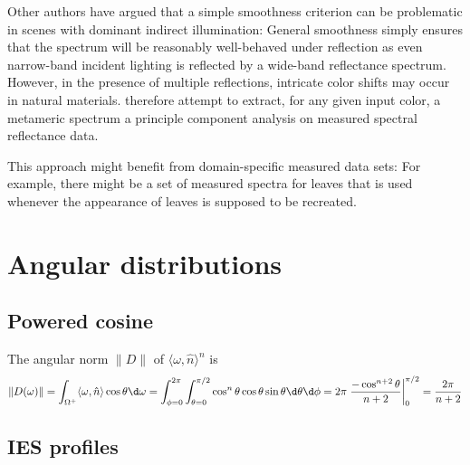Other authors have argued that a simple smoothness criterion can be problematic
in scenes with dominant indirect illumination: 
General smoothness simply ensures that the spectrum
will be reasonably well-behaved under reflection as even narrow-band incident lighting is
reflected by a wide-band reflectance spectrum. However, in the presence of multiple
reflections, intricate color shifts may occur in natural materials.
\citet{otsu2017} therefore attempt to extract, for any given input color, a metameric spectrum 
a principle component analysis on measured spectral reflectance data.

This approach might benefit from domain-specific measured data sets: For example, there might
be a set of measured spectra for leaves that is used whenever the appearance of leaves
is supposed to be recreated.



\section{Angular distributions}\label{sec:angular_norm}

\subsection{Powered cosine}

The angular norm $\|D\|$ of $\langle \omega, \hat n \rangle^n$ is
\begin{equation}
\|D(\omega)\|
   = \int_{\Omega^+} \langle \omega, \hat n \rangle \cos\theta \d\omega
   = \int_{\phi = 0}^{2\pi} \int_{\theta = 0}^{\pi/2} \cos^n\theta \cos\theta
     \sin\theta \d\theta \d\phi
   = 2\pi \left.\frac{-\cos^{n+2}\theta}{n+2}\right|_0^{\pi/2}
   = \frac{2\pi}{n+2}
\end{equation}

\subsection{IES profiles}

